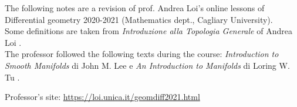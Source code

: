 The following notes are a revision of prof. Andrea Loi's online lessons of Differential geometry 2020-2021 (Mathematics dept., Cagliary University). \\
Some definitions are taken from \textit{Introduzione alla Topologia Generale} of Andrea Loi \autocite{loi}. \\
The professor followed the following texts during the course: \textit{Introduction to Smooth Manifolds} di John M. Lee \cite{lee} e \textit{An Introduction to Manifolds} di Loring W. Tu \cite{tu}.

Professor's site: \url{https://loi.unica.it/geomdiff2021.html}